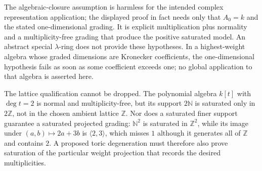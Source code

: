 The algebraic-closure assumption is harmless for the intended
complex representation application; the displayed proof in
fact needs only that $A_0=k$ and the stated one-dimensional
grading. It is explicit multiplication plus normality and a
multiplicity-free grading that produce the positive saturated
model. An abstract special $\lambda$-ring does not provide these
hypotheses. In a highest-weight algebra whose graded dimensions
are Kronecker coefficients, the one-dimensional hypothesis fails
as soon as some coefficient exceeds one; no global application
to that algebra is asserted here.

The lattice qualification cannot be dropped. The polynomial
algebra $k[t]$ with $\deg t=2$ is normal and multiplicity-free,
but its support $2\mathbb N$ is saturated only in $2\mathbb Z$,
not in the chosen ambient lattice $\mathbb Z$. Nor does a
saturated finer support guarantee a saturated projected grading:
$\mathbb N^2$ is saturated in $\mathbb Z^2$, while its image under
$(a,b)\mapsto2a+3b$ is $\langle2,3\rangle$, which misses $1$
although it generates all of $\mathbb Z$ and contains $2$.
A proposed toric degeneration must therefore also prove
saturation of the particular weight projection that records
the desired multiplicities.
